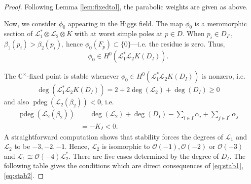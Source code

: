 \documentclass[12pt,letterpaper,reqno]{amsart}
\theoremstyle{remark}
\theoremstyle{definition}
\numberwithin{thm}{section}
\numberwithin{equation}{section}
\numberwithin{figure}{section}
\newcommand{\cL}{\ensuremath{\mathcal L}}
\newcommand{\cO}{\ensuremath{\mathcal O}}
\newcommand{\C}{\ensuremath{\mathbb C}}
\DeclareMathOperator{\pdeg}{pdeg}
\begin{document}
 \begin{proof}
 Following Lemma \ref{lem:fixedtoI}, the parabolic weights are given as above.

 \medskip
 
Now, we consider $\phi_0$ appearing in the Higgs field. The map $\phi_0$ is a meromorphic section of $\cL_1^*\otimes\cL_2\otimes K$
with at worst simple poles at $p\in D$. When $p_i \in D_{I^c}$,  
$\beta_1(p_i)> \beta_2(p_i)$, hence $\phi_0(F_p) \subset \{0\}$---i.e. the residue is zero.
Thus,
\[\phi_0\in H^0(\cL_1^* \cL_2 K(D_I)).\]

 \medskip
 
The $\C^\times$-fixed point is stable whenever $\phi_0\in H^0(\cL_1^*\cL_2K(D_I))$ is nonzero, i.e. 
\begin{equation} \deg(\cL_1^*\cL_2K(D_I))=2+2\deg(\cL_2)+\deg(D_I)\geq 0 \label{eq:stab1}
\end{equation}
 and also $\pdeg(\cL_2(\beta_2))<0$, i.e. 
\begin{align}
\pdeg(\cL_2(\beta_2))&=\deg(\cL_2)+\deg(D_I)-\sum_{i\in I}\alpha_i+\sum_{j\in I^c}\alpha_j \nonumber \\
&=-K_I<0.\label{eq:stab2}
\end{align}
A straightforward computation shows that stability forces the degrees of $\cL_1$ and $\cL_2$ to be $-3,-2,-1$. Hence, $\cL_2$ is isomorphic to $\cO(-1),\cO(-2)$ or $\cO(-3)$ and $\cL_1\cong\cO(-4)\cL_2^*.$ There are five cases determined by the degree of $D_I.$ The following table gives the conditions which are direct consequences of \eqref{eq:stab1}, \eqref{eq:stab2}.


\end{proof}
\end{document}
